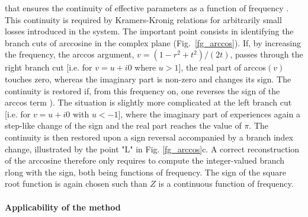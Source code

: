 that ensures the continuity of effective parameters as a function of frequency . This continuity is required by Kramers-Kronig relations for arbitrarily small losses introduced in the system. The important point consists in identifying the branch cuts of arccosine in the complex plane (Fig.\ \ref{fg_arccos}). If, by increasing the frequency, the arccos argument, $v = (1 - r^2+t^2)/(2 t)$, passes through the right branch cut [i.e.  for $v= u+i 0$ where $u>1$], the real part of arccos$(v)$ touches zero, whereas the imaginary part is non-zero and changes its sign. The continuity is restored if, from this frequency on, one reverses the sign of the arccos term ). The situation is slightly more complicated at the left branch cut [i.e. for $v = u+i 0$ with $u<-1$], where the imaginary part of  experiences again a step-like change of the sign and the real part reaches the value of $\pi$. The continuity is then restored upon a sign reversal accompanied by a branch index change,  illustrated by the point "L" in Fig. \ref{fg_arccos}c. A correct reconstruction of the arccosine therefore only requires to compute the integer-valued branch rlong with the sign, both being functions of frequency. The sign of the square root function is again chosen such than $Z$ is a continuous function of frequency.  

\paragraph{Applicability of the method}%

